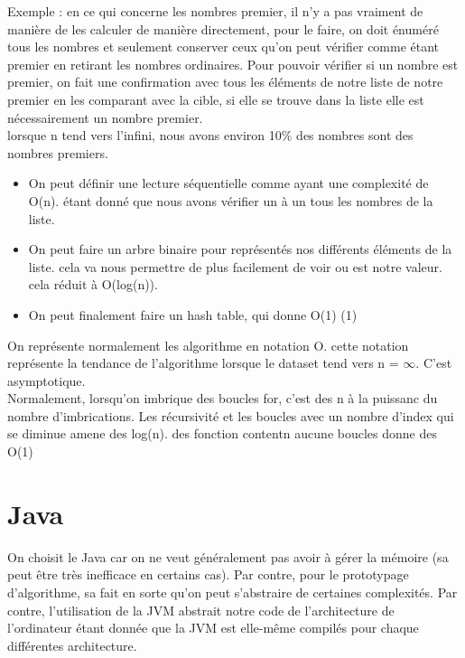 \documentclass[oneside]{book}
\begin{document}
Exemple : en ce qui concerne les nombres premier, il n'y a pas vraiment de manière de les calculer de manière directement, pour le faire, on doit énuméré tous les nombres et seulement conserver ceux qu'on peut vérifier comme étant premier en retirant les nombres ordinaires. Pour pouvoir vérifier si un nombre est premier, on fait une confirmation avec tous les éléments de notre liste de notre premier en les comparant avec la cible, si elle se trouve dans la liste elle est nécessairement un nombre premier. \\

lorsque n tend vers l'infini, nous avons environ 10\% des nombres sont des nombres premiers.\\

\begin{itemize}
\item On peut définir une lecture séquentielle comme ayant une complexité de O(n). étant donné que nous avons vérifier un à un tous les nombres de la liste.\\
\item On peut faire un arbre binaire pour représentés nos différents éléments de la liste. cela va nous permettre de plus facilement de voir ou est notre valeur. cela réduit à O(log(n)).
\item On peut finalement faire un hash table, qui donne O(1) (1)
\end{itemize}


On représente normalement les algorithme en notation O. cette notation représente la tendance de l'algorithme lorsque le dataset tend vers n = $\infty$. C'est asymptotique. \\

Normalement, lorsqu'on imbrique des boucles for, c'est des n à la puissanc du nombre d'imbrications. Les récursivité et les boucles avec un nombre d'index qui se diminue amene des log(n). des fonction contentn aucune boucles donne des O(1)

\section{Java}
On choisit le Java car on ne veut généralement pas avoir à gérer la mémoire (sa peut être très inefficace en certains cas). Par contre, pour le prototypage d'algorithme, sa fait en sorte qu'on peut s'abstraire de certaines complexités. Par contre, l'utilisation de la JVM abstrait notre code de l'architecture de l'ordinateur étant donnée que la JVM est elle-même compilés pour chaque différentes architecture. 
\end{document}
